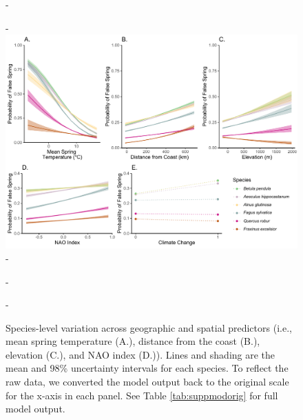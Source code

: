 \documentclass{article}\usepackage[]{graphicx}\usepackage[]{color}
\begin{document}
  
{\begin{figure} [H]
  -\begin{center}
  -\includegraphics[width=16cm]{..//analyses/figures/InteractionPlots/Species_orig_98.pdf}
  -\caption{Species-level variation across geographic and spatial predictors (i.e., mean spring temperature (A.), distance from the coast (B.), elevation (C.), and NAO index (D.)). Lines and shading are the mean and 98\% uncertainty intervals for each species. To reflect the raw data, we converted the model output back to the original scale for the x-axis in each panel. See Table \ref{tab:suppmodorig} for full model output. }\label{fig:spp}
  -\end{center}
  -\end{figure}}


  
\end{document}

